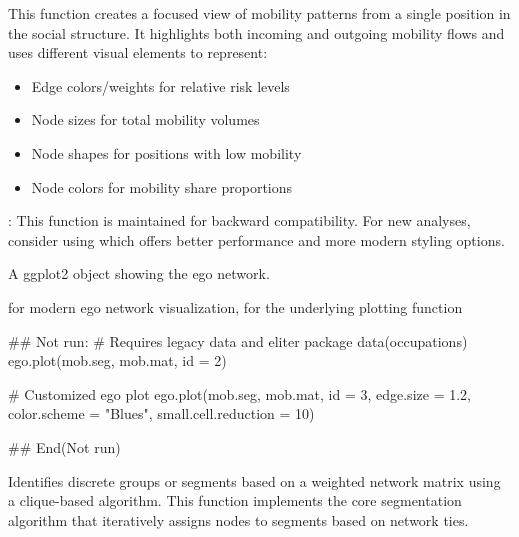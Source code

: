 \documentclass[a4paper]{book}
\begin{document}
\begin{Details}
This function creates a focused view of mobility patterns from a single position
in the social structure. It highlights both incoming and outgoing mobility flows
and uses different visual elements to represent:
\begin{itemize}

\item{} Edge colors/weights for relative risk levels
\item{} Node sizes for total mobility volumes
\item{} Node shapes for positions with low mobility
\item{} Node colors for mobility share proportions

\end{itemize}


: This function is maintained for backward compatibility.
For new analyses, consider using  which offers
better performance and more modern styling options.
\end{Details}
%
\begin{Value}
A ggplot2 object showing the ego network.
\end{Value}
%
\begin{SeeAlso}
 for modern ego network visualization,
 for the underlying plotting function
\end{SeeAlso}
%
\begin{Examples}
\begin{ExampleCode}
## Not run: 
# Requires legacy data and eliter package
data(occupations)
ego.plot(mob.seg, mob.mat, id = 2)

# Customized ego plot
ego.plot(mob.seg, mob.mat, 
         id = 3,
         edge.size = 1.2,
         color.scheme = "Blues",
         small.cell.reduction = 10)

## End(Not run)

\end{ExampleCode}
\end{Examples}
%
\begin{Description}
Identifies discrete groups or segments based on a weighted network matrix using a 
clique-based algorithm. This function implements the core segmentation algorithm
that iteratively assigns nodes to segments based on network ties.
\end{Description}
\end{document}

